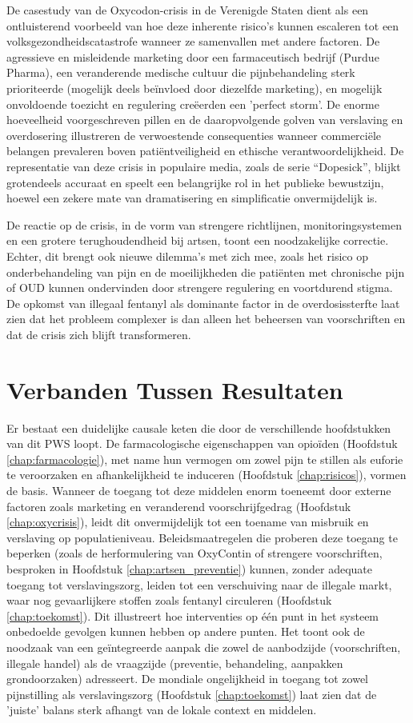 \documentclass[11pt, a4paper]{report} %
\begin{document}
De casestudy van de Oxycodon-crisis in de Verenigde Staten dient als een ontluisterend voorbeeld van hoe deze inherente risico's kunnen escaleren tot een volksgezondheidscatastrofe wanneer ze samenvallen met andere factoren. De agressieve en misleidende marketing door een farmaceutisch bedrijf (Purdue Pharma), een veranderende medische cultuur die pijnbehandeling sterk prioriteerde (mogelijk deels beïnvloed door diezelfde marketing), en mogelijk onvoldoende toezicht en regulering creëerden een 'perfect storm'. De enorme hoeveelheid voorgeschreven pillen en de daaropvolgende golven van verslaving en overdosering illustreren de verwoestende consequenties wanneer commerciële belangen prevaleren boven patiëntveiligheid en ethische verantwoordelijkheid. De representatie van deze crisis in populaire media, zoals de serie \enquote{Dopesick}, blijkt grotendeels accuraat en speelt een belangrijke rol in het publieke bewustzijn, hoewel een zekere mate van dramatisering en simplificatie onvermijdelijk is.

De reactie op de crisis, in de vorm van strengere richtlijnen, monitoringsystemen en een grotere terughoudendheid bij artsen, toont een noodzakelijke correctie. Echter, dit brengt ook nieuwe dilemma's met zich mee, zoals het risico op onderbehandeling van pijn en de moeilijkheden die patiënten met chronische pijn of OUD kunnen ondervinden door strengere regulering en voortdurend stigma. De opkomst van illegaal fentanyl als dominante factor in de overdosissterfte laat zien dat het probleem complexer is dan alleen het beheersen van voorschriften en dat de crisis zich blijft transformeren.

\section{Verbanden Tussen Resultaten}
Er bestaat een duidelijke causale keten die door de verschillende hoofdstukken van dit PWS loopt. De farmacologische eigenschappen van opioïden (Hoofdstuk \ref{chap:farmacologie}), met name hun vermogen om zowel pijn te stillen als euforie te veroorzaken en afhankelijkheid te induceren (Hoofdstuk \ref{chap:risicos}), vormen de basis. Wanneer de toegang tot deze middelen enorm toeneemt door externe factoren zoals marketing en veranderend voorschrijfgedrag (Hoofdstuk \ref{chap:oxycrisis}), leidt dit onvermijdelijk tot een toename van misbruik en verslaving op populatieniveau. Beleidsmaatregelen die proberen deze toegang te beperken (zoals de herformulering van OxyContin of strengere voorschriften, besproken in Hoofdstuk \ref{chap:artsen_preventie}) kunnen, zonder adequate toegang tot verslavingszorg, leiden tot een verschuiving naar de illegale markt, waar nog gevaarlijkere stoffen zoals fentanyl circuleren (Hoofdstuk \ref{chap:toekomst}). Dit illustreert hoe interventies op één punt in het systeem onbedoelde gevolgen kunnen hebben op andere punten. Het toont ook de noodzaak van een geïntegreerde aanpak die zowel de aanbodzijde (voorschriften, illegale handel) als de vraagzijde (preventie, behandeling, aanpakken grondoorzaken) adresseert. De mondiale ongelijkheid in toegang tot zowel pijnstilling als verslavingszorg (Hoofdstuk \ref{chap:toekomst}) laat zien dat de 'juiste' balans sterk afhangt van de lokale context en middelen.
\end{document}
